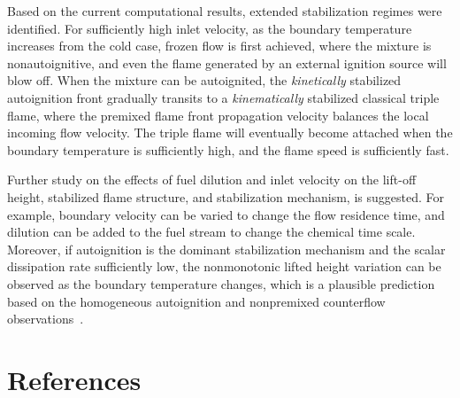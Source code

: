 \documentclass[review,3p,times]{elsarticle}
\begin{document}
Based on the current computational results, extended stabilization regimes were identified.  For sufficiently high inlet velocity, as the boundary temperature increases from the cold case, frozen flow is first achieved, where the mixture is nonautoignitive, and even the flame generated by an external ignition source will blow off.  When the mixture can be autoignited, the \emph {kinetically} stabilized autoignition front gradually transits to a \emph {kinematically} stabilized classical triple flame, where the premixed flame front propagation velocity balances the local incoming flow velocity.  The triple flame will eventually become attached when the boundary temperature is sufficiently high, and the flame speed is sufficiently fast.

Further study on the effects of fuel dilution and inlet velocity on the lift-off height, stabilized flame structure, and stabilization mechanism, is suggested.  For example, boundary velocity can be varied to change the flow residence time, and dilution can be added to the fuel stream to change the chemical time scale.  Moreover, if autoignition is the dominant stabilization mechanism and the scalar dissipation rate sufficiently low, the nonmonotonic lifted height variation can be observed as the boundary temperature changes, which is a plausible prediction based on the homogeneous autoignition and nonpremixed counterflow observations~\cite{deng14}.




\section*{References}



\renewcommand{\thefigure}{\arabic{figure}}
\renewcommand{\thetable}{\arabic{table}}
\end{document}
